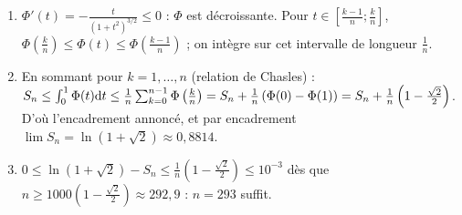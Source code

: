 \begin{corrige}
\begin{sol}
\begin{description}
\begin{enumerate}
\begin{enumerate}
            \item $\Phi'(t) = -\frac{t}{(1 + t^2)^{3/2}} \leq 0$ : $\Phi$ est d\'ecroissante. Pour $t \in \left[ \frac{k-1}{n} ; \frac{k}{n} \right]$,
                  $\Phi\left( \frac{k}{n} \right) \leq \Phi(t) \leq \Phi\left( \frac{k-1}{n} \right)$ ; on int\`egre sur cet intervalle
                  de longueur $\frac{1}{n}$.
            \item En sommant pour $k = 1, \ldots, n$ (relation de Chasles) :
                  $S_n \leq \int_0^1 \Phi(t)\mathrm{d}t \leq \frac{1}{n}\sum_{k=0}^{n-1}\Phi\left( \frac{k}{n} \right) = S_n + \frac{1}{n}\left( \Phi(0) - \Phi(1) \right)
                  = S_n + \frac{1}{n}\left( 1 - \frac{\sqrt{2}}{2} \right)$.
                  D'o\`u l'encadrement annonc\'e, et par encadrement $\boxed{\lim S_n = \ln(1 + \sqrt{2})} \approx 0{,}8814$.
            \item $0 \leq \ln(1 + \sqrt{2}) - S_n \leq \frac{1}{n}\left( 1 - \frac{\sqrt{2}}{2} \right) \leq 10^{-3}$ d\`es que
                  $n \geq 1000\left( 1 - \frac{\sqrt{2}}{2} \right) \approx 292{,}9$ : $\boxed{n = 293}$ suffit.
            \end{enumerate}
      \end{enumerate}
\end{description}
\end{sol}
\end{corrige}
